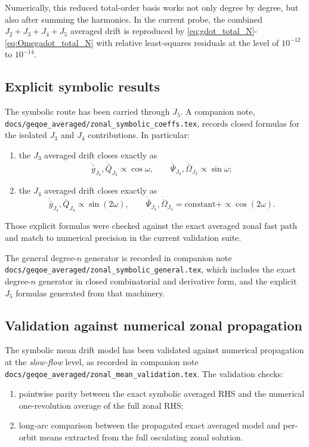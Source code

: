 \documentclass[11pt]{article}
\begin{document}
Numerically, this reduced total-order basis works not only degree by degree,
but also after summing the harmonics. In the current probe, the combined
$J_2+J_3+J_4+J_5$ averaged drift is reproduced by
\eqref{eq:gdot_total_N}-\eqref{eq:Omegadot_total_N} with relative least-squares
residuals at the level of $10^{-12}$ to $10^{-14}$.

\subsection{Explicit symbolic results}

The symbolic route has been carried through $J_5$.
A companion note,
\texttt{docs/geqoe\_averaged/zonal\_symbolic\_coeffs.tex},
records closed formulas for the isolated $J_3$ and $J_4$ contributions. In
particular:
\begin{enumerate}
    \item the $J_3$ averaged drift closes exactly as
    \begin{equation}
    \dot{\bar g}_{J_3},\dot{\bar Q}_{J_3}\propto \cos\omega,
    \qquad
    \dot{\bar\Psi}_{J_3},\dot{\bar\Omega}_{J_3}\propto \sin\omega;
    \end{equation}
    \item the $J_4$ averaged drift closes exactly as
    \begin{equation}
    \dot{\bar g}_{J_4},\dot{\bar Q}_{J_4}\propto \sin(2\omega),
    \qquad
    \dot{\bar\Psi}_{J_4},\dot{\bar\Omega}_{J_4}
    = \text{constant} + \propto \cos(2\omega).
    \end{equation}
\end{enumerate}

Those explicit formulas were checked against the exact averaged zonal fast path
and match to numerical precision in the current validation suite.

The general degree-$n$ generator is recorded in companion note
\texttt{docs/geqoe\_averaged/zonal\_symbolic\_general.tex},
which includes the exact degree-$n$ generator in closed combinatorial and
derivative form, and the explicit $J_5$ formulas generated from that machinery.

\subsection{Validation against numerical zonal propagation}

The symbolic mean drift model has been validated against numerical propagation
at the \emph{slow-flow} level, as recorded in companion note
\texttt{docs/geqoe\_averaged/zonal\_mean\_validation.tex}.
The validation checks:
\begin{enumerate}
    \item pointwise parity between the exact symbolic averaged RHS and the
    numerical one-revolution average of the full zonal RHS;
    \item long-arc comparison between the propagated exact averaged model and
    per-orbit means extracted from the full osculating zonal solution.
\end{enumerate}
\end{document}
